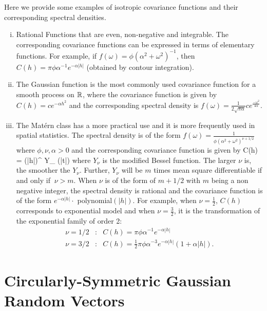 Here we provide some examples of isotropic covariance functions and their corresponding spectral densities.
\begin{enumerate}[(i)]
	\item Rational Functions that are even,  non-negative and integrable. The corresponding covariance functions can be expressed in terms of elementary functions. For example, if $f(\omega) =\phi (\alpha^2+\omega^2)^{-1}$, then $C(h) = \pi\phi\alpha^{-1}e^{-\alpha|h|}$ (obtained by contour integration).
	
	\item The Gaussian \cov function is the most commonly used covariance function for a smooth process on $\mathbb{R}$, where the covariance function is given by $C(h)=ce^{-\alpha h^2}$ and the corresponding spectral density is $ f(\omega) = \frac{1}{2\sqrt{\pi\alpha}}c e^{\frac{-\omega^2}{4\alpha}}$.

	\item The Mat\'{e}rn class has a more practical use and it is more frequently used in spatial statistics. The spectral density is of the form $f(\omega) =\frac{1}{\phi(\alpha^2+\omega^2)^{\nu+1/2}}$ where $\phi,\nu,\alpha>0$ and the corresponding covariance function is given by
	      \beq
	      C(h) =  (\alpha|h|)^{\nu} Y_{\nu} (\alpha|t|)
	      \eeq
	      where $Y_{\nu}$ is the modified Bessel function. The larger $\nu$ is, the smoother the $Y_{\nu}$. Further, $Y_{\nu}$ will be $m$ times mean square differentiable if and only if $\ \nu>m$. When $\nu$ is of the form of $m+1/2$ with $m$ being a non negative integer, the spectral density is rational and the covariance function is of the form $e^{-\alpha|h|}\cdot$ polynomial$(|h|)$. For example, when $\nu=\frac{1}{2}$, $C(h)$ corresponds to exponential model and when $\nu=\frac{3}{2}$, it is the transformation of the exponential family of order 2:
	      \begin{eqnarray*}
	      	\nu = 1/2 &:& C(h) = \pi\phi\alpha^{-1}e^{-\alpha|h|}\\
	      	\nu = 3/2 &:& C(h) = \frac{1}{2}\pi\phi\alpha^{-3}e^{-\alpha|h|}(1+\alpha|h|).
	      \end{eqnarray*}
\end{enumerate}	

\section{Circularly-Symmetric Gaussian Random Vectors}

